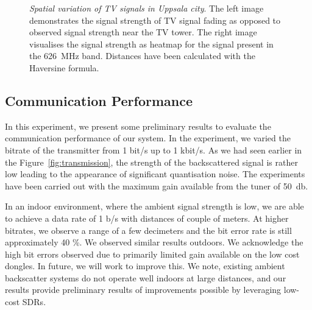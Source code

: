 \begin{figure}[h]
\begin{minipage}{0.49\columnwidth}
	\end{minipage}
	\vspace{-6mm}
	\caption{\emph{Spatial variation of TV signals in Uppsala city}. 
	The left image demonstrates the signal strength of TV signal fading	
	as opposed to observed signal strength near the TV tower. 
	The right image visualises the signal strength as heatmap for the signal
	present in the \SI{626}{\mega\hertz} band. Distances have been
calculated with the Haversine formula. }
 	\vspace{-6mm}

\label{fig:haversine}
\end{figure}

\balance

\subsection{Communication Performance}
In this experiment, we present some preliminary results to evaluate the communication
performance of our system.  In the experiment, we varied the bitrate of the transmitter
from 1 bit/s up to 1 kbit/s. As we had seen earlier in the Figure~\ref{fig:transmission}, the strength
of the backscattered signal is rather low leading to the appearance of significant quantisation noise.
The experiments have been carried out with the maximum gain available from the tuner of \SI{50}{\decibel}.

In an indoor environment, where the ambient signal strength is low, we are
able to achieve a data rate of 1 b/s with distances of
couple of meters. At higher bitrates, we observe a range of a few decimeters and the  bit error rate is still approximately 40 \%. 
We observed similar results outdoors. We acknowledge the high bit errors
observed due to primarily limited gain available on the low cost dongles.
In future, we will work to improve this. We note, existing ambient backscatter
systems do not operate well indoors at large distances, and our results
provide preliminary results of  improvements possible by leveraging low-cost
SDRs.
